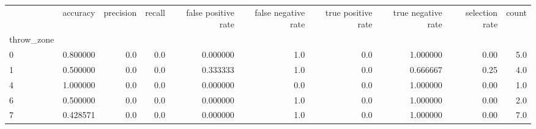 \begin{tabular}{lrrrrrrrrr}
\toprule
{} &  accuracy &  precision &  recall &  false positive rate &  false negative rate &  true positive rate &  true negative rate &  selection rate &  count \\
throw\_zone &           &            &         &                      &                      &                     &                     &                 &        \\
\midrule
0          &  0.800000 &        0.0 &     0.0 &             0.000000 &                  1.0 &                 0.0 &            1.000000 &            0.00 &    5.0 \\
1          &  0.500000 &        0.0 &     0.0 &             0.333333 &                  1.0 &                 0.0 &            0.666667 &            0.25 &    4.0 \\
4          &  1.000000 &        0.0 &     0.0 &             0.000000 &                  0.0 &                 0.0 &            1.000000 &            0.00 &    1.0 \\
6          &  0.500000 &        0.0 &     0.0 &             0.000000 &                  1.0 &                 0.0 &            1.000000 &            0.00 &    2.0 \\
7          &  0.428571 &        0.0 &     0.0 &             0.000000 &                  1.0 &                 0.0 &            1.000000 &            0.00 &    7.0 \\
\bottomrule
\end{tabular}
